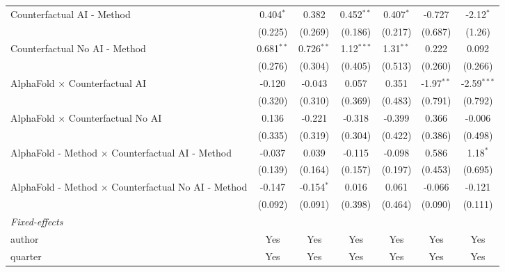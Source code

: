 \begin{tabular}{lcccccc}
   Counterfactual AI - Method                                 & 0.404$^{*}$  & 0.382        & 0.452$^{**}$ & 0.407$^{*}$  & -0.727       & -2.12$^{*}$\\   
                                                              & (0.225)      & (0.269)      & (0.186)      & (0.217)      & (0.687)      & (1.26)\\   
   Counterfactual No AI - Method                              & 0.681$^{**}$ & 0.726$^{**}$ & 1.12$^{***}$ & 1.31$^{**}$  & 0.222        & 0.092\\   
                                                              & (0.276)      & (0.304)      & (0.405)      & (0.513)      & (0.260)      & (0.266)\\   
   AlphaFold $\times$ Counterfactual AI                       & -0.120       & -0.043       & 0.057        & 0.351        & -1.97$^{**}$ & -2.59$^{***}$\\   
                                                              & (0.320)      & (0.310)      & (0.369)      & (0.483)      & (0.791)      & (0.792)\\   
   AlphaFold $\times$ Counterfactual No AI                    & 0.136        & -0.221       & -0.318       & -0.399       & 0.366        & -0.006\\   
                                                              & (0.335)      & (0.319)      & (0.304)      & (0.422)      & (0.386)      & (0.498)\\   
   AlphaFold - Method $\times$ Counterfactual AI - Method     & -0.037       & 0.039        & -0.115       & -0.098       & 0.586        & 1.18$^{*}$\\   
                                                              & (0.139)      & (0.164)      & (0.157)      & (0.197)      & (0.453)      & (0.695)\\   
   AlphaFold - Method $\times$ Counterfactual No AI - Method  & -0.147       & -0.154$^{*}$ & 0.016        & 0.061        & -0.066       & -0.121\\   
                                                              & (0.092)      & (0.091)      & (0.398)      & (0.464)      & (0.090)      & (0.111)\\   
   \midrule
   \emph{Fixed-effects}\\
   author                                                     & Yes          & Yes          & Yes          & Yes          & Yes          & Yes\\  
   quarter                                                    & Yes          & Yes          & Yes          & Yes          & Yes          & Yes\\  

\end{tabular}
